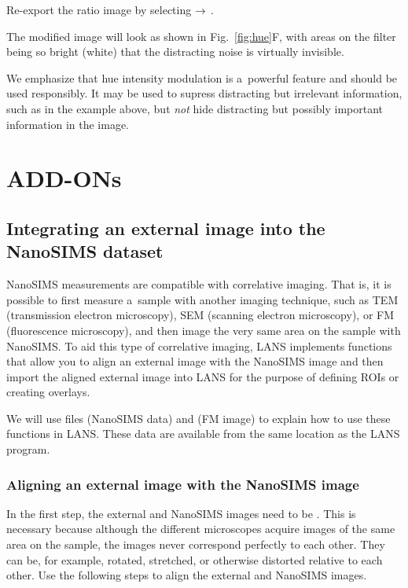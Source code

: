\s Re-export the ratio image by selecting  $\rightarrow$ .

\bul The modified image will look as shown in Fig.~\ref{fig:hue}F, with areas on the filter being so bright (white) that the distracting noise is virtually invisible.

\vskip3mm\noindent
We emphasize that hue intensity modulation is a~powerful feature and should be used responsibly. It may be used to supress distracting but irrelevant information, such as in the example above, but \emph{not} hide distracting but possibly important information in the image.

\fi

\section{ADD-ONs}

\subsection{Integrating an external image into the NanoSIMS dataset}
\setcounter{step}{0}

NanoSIMS measurements are compatible with correlative imaging. That is, it is possible to first measure a~sample with another imaging technique, such as TEM (transmission electron microscopy), SEM (scanning electron microscopy), or FM (fluorescence microscopy), and then image the very same area on the sample with NanoSIMS. To aid this type of correlative imaging, LANS implements functions that allow you to align an external image with the NanoSIMS image and then import the aligned external image into LANS for the purpose of defining ROIs or creating overlays.

We will use files  (NanoSIMS data) and  (FM image) to explain how to use these functions in LANS. These data are available from the same location as the LANS program.

\subsubsection{Aligning an external image with the NanoSIMS image}
\setcounter{step}{0}

In the first step, the external and NanoSIMS images need to be . This is necessary because although the different microscopes acquire images of the same area on the sample, the images never correspond perfectly to each other. They can be, for example, rotated, stretched, or otherwise distorted relative to each other. Use the following steps to align the external and NanoSIMS images.

